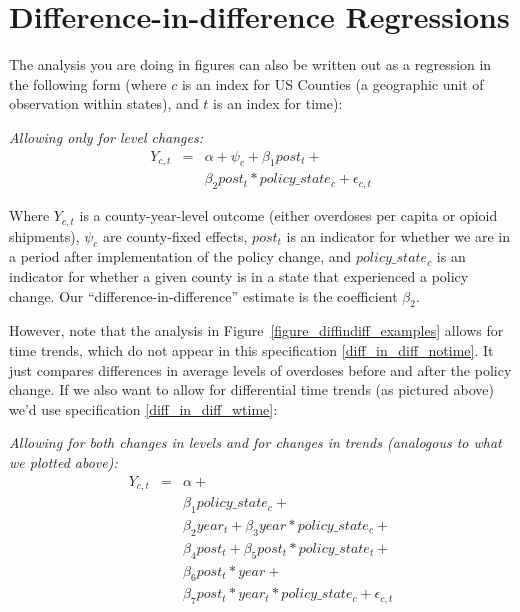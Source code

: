 \documentclass[12pt]{article}
\begin{document}
\appendix

\section{Difference-in-difference Regressions}\label{appendix_diffindiff}

The analysis you are doing in figures can also be written out as a regression in the following form (where $c$ is an index for US Counties (a geographic unit of observation within states), and $t$ is an index for time):

\emph{Allowing only for level changes:}
\begin{eqnarray}
 Y_{c,t} &=& \alpha + \psi_{c} + \beta_1 post_{t} + \label{diff_in_diff_notime}\\
  && \beta_2 post_{t} * policy\_state_{c} + \epsilon_{c,t} \nonumber
\end{eqnarray}

Where $Y_{c,t}$ is a county-year-level outcome (either overdoses per capita or opioid shipments),  $\psi_c$ are county-fixed effects, $post_{t}$ is an indicator for whether we are in a period after implementation of the policy change, and $policy\_state_{c}$ is an indicator for whether a given county is in a state that experienced a policy change. Our ``difference-in-difference'' estimate is the coefficient $\beta_2$.

However, note that the analysis in Figure~\ref{figure_diffindiff_examples} allows for time trends, which do not appear in this specification \ref{diff_in_diff_notime}. It just compares differences in average levels of overdoses before and after the policy change. If we also want to allow for differential time trends (as pictured above) we'd use specification \ref{diff_in_diff_wtime}:

\emph{Allowing for both changes in levels and for changes in trends (analogous to what we plotted above):}
\begin{eqnarray}
 Y_{c,t} &=& \alpha + \label{diff_in_diff_wtime}\\
 && \beta_1 policy\_state_{c} + \nonumber\\
 && \beta_2 year_{t} + \beta_3 year * policy\_state_{c} + \nonumber\\
 && \beta_4 post_{t} + \beta_5 post_{t} * policy\_state_{t} + \nonumber \\
 && \beta_6 post_{t} * year + \nonumber\\
 && \beta_7 post_{t} * year_{t} * policy\_state_{c} + \epsilon_{c,t} \nonumber
\end{eqnarray}
\end{document}

